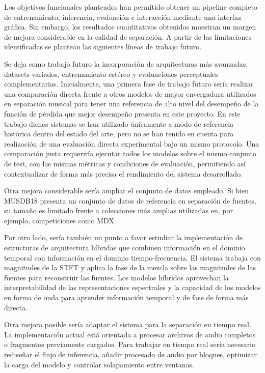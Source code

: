 Los objetivos funcionales planteados han permitido obtener un pipeline completo de entrenamiento, inferencia, evaluación e interacción mediante una interfaz gráfica. Sin embargo, los resultados cuantitativos obtenidos muestran un margen de mejora considerable en la calidad de separación. A partir de las limitaciones identificadas se plantean las siguientes líneas de trabajo futuro.

Se deja como trabajo futuro la incorporación de arquitecturas más avanzadas, datasets variados, entrenamiento estéreo y evaluaciones perceptuales complementarias. Inicialmente, una primera fase de trabajo futuro sería realizar una comparación directa frente a otros modelos de mayor envergadura utilizados en separación musical para tener una referencia de alto nivel del desempeño de la función de pérdida que mejor desempeño presenta en este proyecto. En este trabajo dichos sistemas se han utilizado únicamente a modo de referencia histórica dentro del estado del arte, 
pero no se han tenido en cuenta para realización de una evaluación directa experimental bajo un mismo protocolo. Una comparación justa requeriría ejecutar todos los modelos sobre el mismo conjunto de test, con las mismas métricas y condiciones de evaluación, permitiendo así contextualizar de forma más precisa el rendimiento del sistema desarrollado.

Otra mejora considerable sería ampliar el conjunto de datos empleado. Si bien MUSDB18 presenta un conjunto de datos de referencia en separación de fuentes, su tamaño es limitado frente a colecciones más amplias utilizadas en, por ejemplo, competiciones como MDX. 

Por otro lado, sería también un punto a favor estudiar la implementación de estructuras de arquitectura híbridas que combinen información en el dominio temporal con información en el dominio tiempo-frecuencia.  El sistema trabaja con magnitudes de la STFT y aplica la fase de la mezcla sobre las magnitudes de las fuentes para reconstruir las fuentes. Los modelos híbridos
aprovechan la interpretabilidad de las representaciones espectrales y la capacidad de los modelos en forma de onda para aprender información temporal y de fase de forma más directa.

Otra mejora posible sería adaptar el sistema para la separación en tiempo real. La implementación actual está orientada a procesar archivos de audio completos o fragmentos previamente cargados. Para trabajar en tiempo real sería necesario rediseñar el flujo de inferencia, añadir procesado de audio por bloques, optimizar la carga del modelo y controlar solapamiento entre ventanas.


